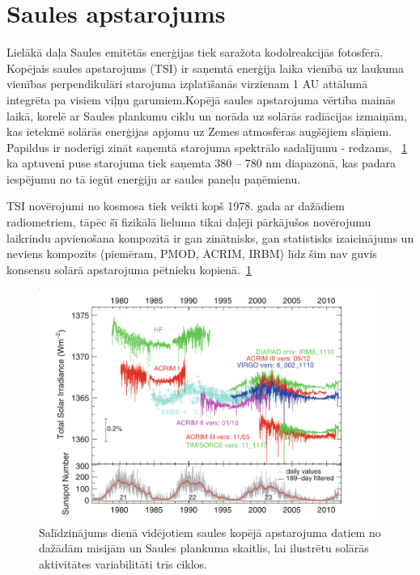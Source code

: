 
\section{Saules apstarojums}

Lielākā daļa Saules emitētās enerģijas tiek saražota kodolreakcijās fotosfērā. Kopējais saules apstarojums (TSI) ir saņemtā enerģija laika vienībā uz laukuma vienības perpendikulāri starojuma izplatīšanās virzienam 1 AU attālumā integrēta pa visiem viļņu garumiem.\cite{ThermalProcesses}Kopējā saules apstarojuma vērtība mainās laikā, korelē ar Saules plankumu ciklu un norāda uz solārās radiācijas izmaiņām, kas ietekmē solārās enerģijas apjomu uz Zemes atmosfēras augšējiem slāņiem. Papildus ir noderīgi zināt saņemtā starojuma spektrālo sadalījumu - redzams, ~\ref{fig:TSI_misijas} ka aptuveni puse starojuma tiek saņemta 380 -- 780 nm diapazonā, kas padara iespējumu no tā iegūt enerģiju ar saules paneļu paņēmienu.

TSI novērojumi no kosmosa tiek veikti kopš 1978. gada ar dažādiem radiometriem, tāpēc šī fizikālā lieluma tikai daļēji pārkājušos novērojumu laikrindu apvienošana kompozītā ir gan zinātnisks, gan statistisks izaicinājums un neviens kompozīts (piemēram, PMOD, ACRIM, IRBM) līdz šim nav guvis konsensu solārā apstarojuma pētnieku kopienā.~\ref{fig:TSI_misijas} 

\begin{figure}[h]
    \centering
    \includegraphics[width=0.6\linewidth]{figures/misc/TSI_misijas.png}
    \caption{Salīdzinājums dienā vidējotiem saules kopējā apstarojuma datiem no dažādām misijām un Saules plankuma skaitlis, lai ilustrētu solārās aktivitātes variabilitāti trīs ciklos. \cite{Frohlich2012}}
    \label{fig:TSI_misijas}
\end{figure}


